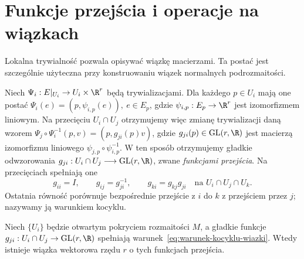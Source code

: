 \section{Funkcje przejścia i operacje na wiązkach}

Lokalna trywialność pozwala opisywać wiązkę macierzami. Ta postać jest
szczególnie użyteczna przy konstruowaniu wiązek normalnych podrozmaitości.

Niech $\Psi_i:E|_{U_i}\to U_i\times\R^r$ będą trywializacjami.
Dla każdego $p\in U_i$ mają one postać $\Psi_i(e)=(p,\psi_{i,p}(e)),\ e\in E_p$,
gdzie $\psi_{i,p}:E_p\to\R^r$ jest izomorfizmem liniowym.
Na przecięciu $U_i\cap U_j$ otrzymujemy więc zmianę trywializacji daną wzorem $\Psi_j\circ\Psi_i^{-1}(p,v)=(p,g_{ji}(p)v)$,
gdzie $g_{ji}(p)\in\mathrm{GL}(r,\R)$ jest macierzą izomorfizmu
liniowego $\psi_{j,p}\circ\psi_{i,p}^{-1}$.
W ten sposób otrzymujemy gładkie odwzorowania $g_{ji}:U_i\cap U_j\longrightarrow\mathrm{GL}(r,\R)$,
zwane \emph{funkcjami przejścia}. Na przecięciach spełniają one
\begin{equation}\label{eq:warunek-kocyklu-wiazki}
g_{ii}=I,\qquad g_{ij}=g_{ji}^{-1},\qquad
g_{ki}=g_{kj}g_{ji}\quad\text{na }U_i\cap U_j\cap U_k.
\end{equation}
Ostatnia równość porównuje bezpośrednie przejście z $i$ do $k$
z przejściem przez $j$; nazywamy ją warunkiem kocyklu.


\begin{twierdzenie}
Niech $\{U_i\}$ będzie otwartym pokryciem rozmaitości $M$, a gładkie funkcje
$g_{ji}:U_i\cap U_j\to\mathrm{GL}(r,\R)$ spełniają
warunek~\eqref{eq:warunek-kocyklu-wiazki}. Wtedy istnieje
wiązka wektorowa rzędu $r$ o tych funkcjach przejścia.
\end{twierdzenie}

